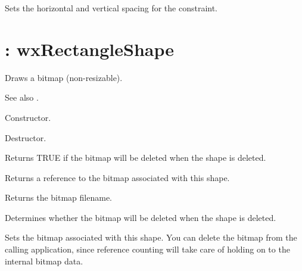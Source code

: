 Sets the horizontal and vertical spacing for the constraint.


\section{: wxRectangleShape}\label{wxbitmapshape}

Draws a bitmap (non-resizable).

See also .



Constructor.



Destructor.



Returns TRUE if the bitmap will be deleted when the shape is deleted.



Returns a reference to the bitmap associated with this shape.



Returns the bitmap filename.



Determines whether the bitmap will be deleted when the shape is deleted.



Sets the bitmap associated with this shape. You can delete the bitmap
from the calling application, since reference counting will take care of
holding on to the internal bitmap data.



